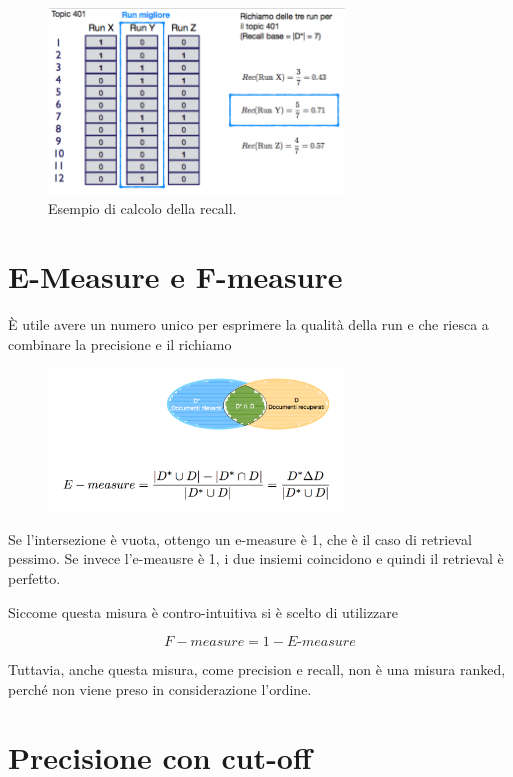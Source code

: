 \begin{figure}[htbp]
	\centering
	\includegraphics[width=0.7\textwidth]{images/l15-fig-2.png}
	\caption{Esempio di calcolo della recall.}
\end{figure}

\section{E-Measure e F-measure}

\`E utile avere un numero unico per esprimere la qualità della run e che riesca a combinare la precisione e il richiamo

\begin{figure}[htbp]
	\centering
	\includegraphics[width=0.7\textwidth]{images/l15-fig-3.png}
\end{figure}

Se l'intersezione è vuota, ottengo un e-measure è 1, che è il caso di retrieval pessimo.
Se invece l'e-meausre è 1, i due insiemi coincidono e quindi il retrieval è perfetto.

Siccome questa misura è contro-intuitiva si è scelto di utilizzare

$$
F-measure = 1 - E\text{-}measure
$$

Tuttavia, anche questa misura, come precision e recall, non è una misura ranked, perché non viene preso in considerazione l'ordine.


\section{Precisione con cut-off}


